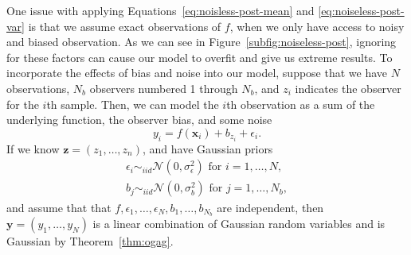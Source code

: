 One issue with applying Equations~\ref{eq:noisless-post-mean} and \ref{eq:noiseless-post-var} is that we assume exact observations of $f$, when we only have access to noisy and biased observation.
As we can see in Figure~\ref{subfig:noiseless-post}, ignoring for these factors can cause our model to overfit and give us extreme results.
To incorporate the effects of bias and noise into our model, suppose that we have $N$ observations, $N_b$ observers numbered 1 through $N_b$, and $z_i$ indicates the observer for the $i$th sample.
Then, we can model the $i$th observation as a sum of the underlying function, the observer bias, and some noise
\begin{equation*}
    y_i = f(\mathbf{x}_i) + b_{z_i} + \epsilon_i.
\end{equation*}
If we know $\mathbf{z} = (z_1, \dots, z_n)$, and have Gaussian priors
\begin{align*}
    \epsilon_i \sim_{iid} \mathcal{N}(0, \sigma^2_{\epsilon}) \text{ for $i = 1, \dots, N$}, \\
    b_j \sim_{iid} \mathcal{N}(0, \sigma_{b}^2) \text{ for $j = 1, \dots, N_b$},
\end{align*}
and assume that that $f, \epsilon_1, \dots, \epsilon_N, b_1, \dots, b_{N_b}$ are independent,
then $\mathbf{y} = (y_1, \dots, y_N)$ is a linear combination of Gaussian random variables
and is Gaussian by Theorem~\ref{thm:ogag}.

